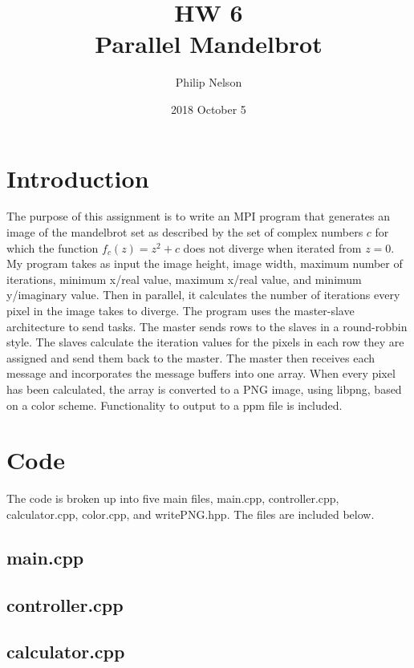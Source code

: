 \documentclass{article}
\title{HW 6 \\ Parallel Mandelbrot}
\author{Philip Nelson}
\date{2018 October 5}
\begin{document}
\maketitle

\section*{Introduction}

The purpose of this assignment is to write an MPI program that generates an image of the mandelbrot set as described by the set of complex numbers $c$ for which the function ${f_{c}(z)=z^{2}+c}$ does not diverge when iterated from $z=0$. My program takes as input the image height, image width, maximum number of iterations, minimum x/real value, maximum x/real value, and minimum y/imaginary value. Then in parallel, it calculates the number of iterations every pixel in the image takes to diverge. The program uses the master-slave architecture to send tasks. The master sends rows to the slaves in a round-robbin style. The slaves calculate the iteration values for the pixels in each row they are assigned and send them back to the master. The master then receives each message and incorporates the message buffers into one array. When every pixel has been calculated, the array is converted to a PNG image, using libpng, based on a color scheme. Functionality to output to a ppm file is included.

\section*{Code}
The code is broken up into five main files, main.cpp, controller.cpp,  calculator.cpp, color.cpp, and writePNG.hpp. The files are included below.

\bigskip

\subsection{main.cpp}


\subsection{controller.cpp}


\subsection{calculator.cpp}

\end{document}
